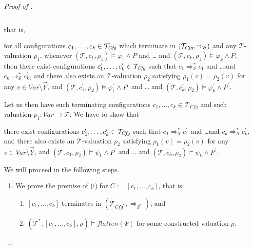 \begin{proof}[Proof of ]
\begin{enumerate}
\begin{proofenv}
\begin{equation*}
        \end{equation*}
    \end{proofenv}
    that is,
    \begin{proofenv}
        for all configurations $c_1,\ldots,c_k \in \mathcal{T}_{\mathit{Cfg}}$
        which terminate in $(\mathcal{T}_{\mathit{Cfg}}, \Rightarrow_{\mathcal{S}})$
        and any $\mathcal{T}$-valuation $\rho_1$,
        whenever $(\mathcal{T}, c_1,\rho_1) \vDash \varphi_1 \land P$ and \ldots
        and $(\mathcal{T}, c_k,\rho_1) \vDash \varphi_k \land P$,
        then there exist configurations $c_1^\prime,\ldots,c_k^\prime \in \mathcal{T}_{\mathit{Cfg}}$
        such that $c_1 \Rightarrow^{*}_{\mathcal{S}} c_1^\prime$
        and \ldots and $c_k \Rightarrow^{*}_{\mathcal{S}} c_k^\prime$,
        and there also exists an $\mathcal{T}$-valuation $\rho_2$
        satisfying $\rho_1(v) = \rho_2(v)$ for any $v \in \mathit{Var} \setminus \vec{Y}$,
        and
        $(\mathcal{T}, c_1^\prime,\rho_2) \vDash \varphi^\prime_1 \land P^\prime$ and \ldots
        and $(\mathcal{T}, c_k^\prime, \rho_2) \vDash \varphi^\prime_k \land P^\prime$.
    \end{proofenv}
    Let us then have such terminating configurations $c_1,\ldots,c_k \in \mathcal{T}_{\mathit{Cfg}}$
    and such valuation $\rho_1 : \mathit{Var} \to \mathcal{T}$.
    We have to show that
    \begin{proofenv}
        there exist configurations $c_1^\prime,\ldots,c_k^\prime \in \mathcal{T}_{\mathit{Cfg}}$
        such that $c_1 \Rightarrow^{*}_{\mathcal{S}} c_1^\prime$
        and \ldots and $c_k \Rightarrow^{*}_{\mathcal{S}} c_k^\prime$,
        and there also exists an $\mathcal{T}$-valuation $\rho_2$
        satisfying $\rho_1(v) = \rho_2(v)$ for any $v \in \mathit{Var} \setminus \vec{Y}$,
        and
        $(\mathcal{T}, c_1^\prime,\rho_2) \vDash \psi_1 \land P^\prime$ and \ldots
        and $(\mathcal{T}, c_k^\prime, \rho_2) \vDash \psi_k \land P^\prime$.
    \end{proofenv}
    We will proceed in the following steps.
    \begin{enumerate}
        \item We prove the premise of (i) for $C := [c_1,\ldots,c_k]$, that is:
        \begin{enumerate}
            \item $[c_1,\ldots,c_k]$ terminates in $(\mathcal{T}_{\mathit{Cfg}^*}, \Rightarrow_{\mathcal{S}^*})$; and
            \item $(\mathcal{T}^*, [c_1,\ldots,c_k], \rho) \vDash \mathit{flatten}(\Psi)$ for some constructed valuation $\rho$.

\end{enumerate}
\end{enumerate}
\end{enumerate}
\end{proof}
